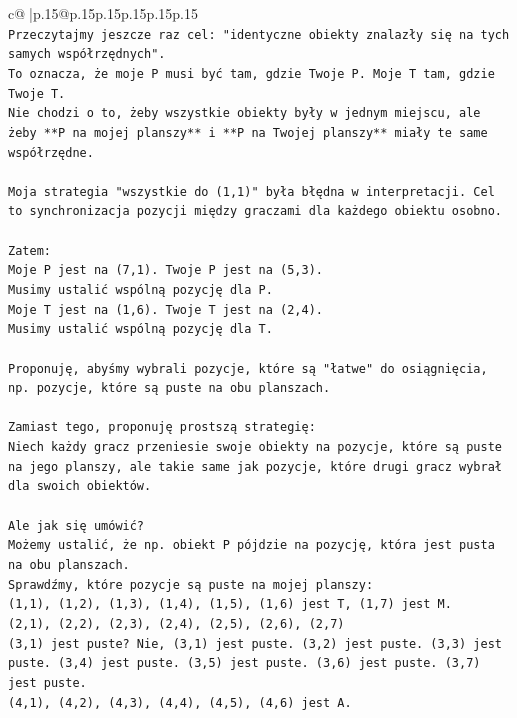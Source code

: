 \documentclass{article}
\begin{document}
{\begin{supertabular}{c@{$\;$}|p{.15\linewidth}@{}p{.15\linewidth}p{.15\linewidth}p{.15\linewidth}p{.15\linewidth}p{.15\linewidth}}
{{{\\ 
\texttt{Przeczytajmy jeszcze raz cel: "identyczne obiekty znalazły się na tych samych współrzędnych".} \\
\texttt{To oznacza, że moje P musi być tam, gdzie Twoje P. Moje T tam, gdzie Twoje T.} \\
\texttt{Nie chodzi o to, żeby wszystkie obiekty były w jednym miejscu, ale żeby **P na mojej planszy** i **P na Twojej planszy** miały te same współrzędne.} \\
\\ 
\texttt{Moja strategia "wszystkie do (1,1)" była błędna w interpretacji. Cel to synchronizacja pozycji między graczami dla każdego obiektu osobno.} \\
\\ 
\texttt{Zatem:} \\
\texttt{Moje P jest na (7,1). Twoje P jest na (5,3).} \\
\texttt{Musimy ustalić wspólną pozycję dla P.} \\
\texttt{Moje T jest na (1,6). Twoje T jest na (2,4).} \\
\texttt{Musimy ustalić wspólną pozycję dla T.} \\
\\ 
\texttt{Proponuję, abyśmy wybrali pozycje, które są "łatwe" do osiągnięcia, np. pozycje, które są puste na obu planszach.} \\
\\ 
\texttt{Zamiast tego, proponuję prostszą strategię:} \\
\texttt{Niech każdy gracz przeniesie swoje obiekty na pozycje, które są puste na jego planszy, ale takie same jak pozycje, które drugi gracz wybrał dla swoich obiektów.} \\
\\ 
\texttt{Ale jak się umówić?} \\
\texttt{Możemy ustalić, że np. obiekt P pójdzie na pozycję, która jest pusta na obu planszach.} \\
\texttt{Sprawdźmy, które pozycje są puste na mojej planszy:} \\
\texttt{(1,1), (1,2), (1,3), (1,4), (1,5), (1,6) jest T, (1,7) jest M.} \\
\texttt{(2,1), (2,2), (2,3), (2,4), (2,5), (2,6), (2,7)} \\
\texttt{(3,1) jest puste? Nie, (3,1) jest puste. (3,2) jest puste. (3,3) jest puste. (3,4) jest puste. (3,5) jest puste. (3,6) jest puste. (3,7) jest puste.} \\
\texttt{(4,1), (4,2), (4,3), (4,4), (4,5), (4,6) jest A.} \\
}}}
\end{supertabular}}
\end{document}
